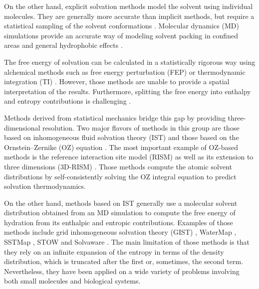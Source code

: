 \documentclass[9pt,tutorial]{livecoms}
\begin{document}
On the other hand, explicit solvation methods model the solvent using individual molecules.
They are generally more accurate than implicit methods, but require a statistical sampling of the solvent conformations \cite{Liu2016-md-solubility,Swails2014-cphmd}.
Molecular dynamics (MD) simulations provide an accurate way of modeling solvent packing in confined areas \cite{Haider2016-water-on-surfaces} and general hydrophobic effects \cite{Pratt2016-hydrophobicity}.

The free energy of solvation can be calculated in a statistically rigorous way using alchemical methods \cite{Liu2016-md-solubility,Mobley2009-dgsolv,Mobley2014-freesolv} such as free energy perturbation (FEP) \cite{Zwanzig1954-reweighting} or thermodynamic integration (TI) \cite{Kirkwood1935-ti}.
However, those methods are unable to provide a spatial interpretation of the results.
Furthermore, splitting the free energy into enthalpy and entropy contributions is challenging \cite{Peter2004-alchemical-entropy}.

Methods derived from statistical mechanics bridge this gap by providing three-dimensional resolution.
Two major flavors of methods in this group are those based on inhomogeneous fluid solvation theory (IST) \cite{Lazaridis1998} and those based on the Ornstein--Zernike (OZ) equation \cite{Hansen2013-simple-liquids}.
The most important example of OZ-based methods is the reference interaction site model (RISM) \cite{Chandler1972-rism} as well as its extension to three dimensions (3D-RISM) \cite{Kovalenko1998-3drism}.
Those methods compute the atomic solvent distributions by self-consistently solving the OZ integral equation to predict solvation thermodynamics.

On the other hand, methods based on IST generally use a molecular solvent distribution obtained from an MD simulation to compute the free energy of hydration from its enthalpic and entropic contributions.
Examples of those methods include grid inhomogeneous solvation theory (GIST) \cite{Nguyen2012,Ramsey2016}, WaterMap \cite{Young2007-watermap,Abel2008-watermap}, SSTMap \cite{Haider2018-sstmap}, STOW \cite{Li2012-stow} and Solvaware \cite{Huggins2016-solvaware}.
The main limitation of those methods is that they rely on an infinite expansion of the entropy in terms of the density distribution, which is truncated after the first or, sometimes, the second \cite{Nguyen2016-gist-second-order,Waibl2022-gist-solvents} term.
Nevertheless, they have been applied on a wide variety of problems involving both small molecules and biological systems.
\end{document}
